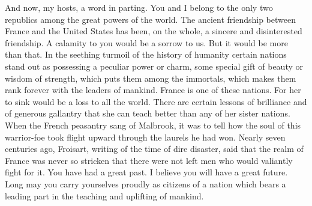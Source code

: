 \documentclass{scrbook}
\begin{document}
And now, my hosts, a word in parting. You and I belong to the only two republics among
the great powers of the world. The ancient friendship between France and the United States
has been, on the whole, a sincere and disinterested friendship. A calamity to you would be
a sorrow to us. But it would be more than that. In the seething turmoil of the history of
humanity certain nations stand out as possessing a peculiar power or charm, some special
gift of beauty or wisdom of strength, which puts them among the immortals, which makes
them rank forever with the leaders of mankind. France is one of these nations. For her to
sink would be a loss to all the world. There are certain lessons of brilliance and of generous
gallantry that she can teach better than any of her sister nations. When the French peasantry
sang of Malbrook, it was to tell how the soul of this warrior-foe took flight upward through
the laurels he had won. Nearly seven centuries ago, Froisart, writing of the time of dire
disaster, said that the realm of France was never so stricken that there were not left men
who would valiantly fight for it. You have had a great past. I believe you will have a great
future. Long may you carry yourselves proudly as citizens of a nation which bears a leading
part in the teaching and uplifting of mankind.
\end{document}
